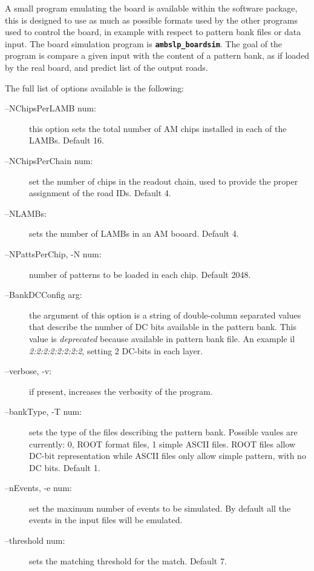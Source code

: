 \label{sec:boardsim}
A small program emulating the board is available within the software
package, this is designed to use as much as possible formats
used by the other programs used to control the board, in example
with respect to pattern bank files or data input. 
The board simulation program is 
\textbf{\texttt{ambslp\_boardsim}}. 
The goal of the program 
is compare a given input with the content of a pattern bank, as if loaded
by the real board, and predict list of the output roads. 

The full list of options available is the following:
\begin{description}
	\item[--NChipsPerLAMB num:] this option sets the total number
	of AM chips installed in each of the LAMBs. Default 16.
	
	\item[--NChipsPerChain num:] set the number of chips in the
	readout chain, used to provide the proper assignment of the
	road IDs. Default 4.
	
	\item[--NLAMBs:] sets the number of LAMBs in an AM booard. 
	Default 4.
	
	\item[--NPattsPerChip, -N num:] number of patterns to be
	loaded in each chip. Default 2048.
	
	\item[--BankDCConfig arg:] the argument of this option is a string
	of double-column separated values that describe the number of
	DC bits available in the pattern bank. This value is
	\emph{deprecated} because available in pattern bank file.
	An example il \emph{2:2:2:2:2:2:2:2}, setting 2 DC-bits in 
	each layer.
	
	\item[--verbose, -v:] if present, increases the verbosity of the program.

	\item[--bankType, -T num:] sets the type of the files describing the
	pattern bank. Possible vaules are currently: 0, ROOT format files, 1
	simple ASCII files. ROOT files allow DC-bit representation while
	ASCII files only allow simple pattern, with no DC bits. Default 1.
	
	\item[--nEvents, -e num:] set the maximum number of events to be simulated.
	By default all the events in the input files will be emulated.
	
	\item[--threshold num:] sets the matching threshold for the match.
	Default 7.
	

\end{description}

